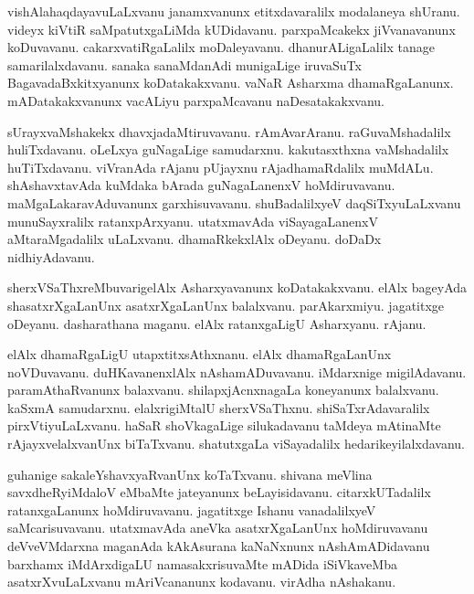 \documentclass{article}
\begin{document}
\begin{mn}%
vishAlahaqdayavuLaLxvanu janamxvanunx etitxdavaralilx modalaneya shUranu. videyx kiVtiR 
saMpatutxgaLiMda kUDidavanu. parxpaMcakekx jiVvanavanunx koDuvavanu. cakarxvatiRgaLalilx 
moDaleyavanu. dhanurALigaLalilx tanage samarilalxdavanu. sanaka sanaMdanAdi munigaLige iruvaSuTx 
BagavadaBxkitxyanunx koDatakakxvanu. vaNaR Asharxma dhamaRgaLanunx. mADatakakxvanunx vacALiyu 
parxpaMcavanu naDesatakakxvanu.
\end{mn}

\begin{mn}%
sUrayxvaMshakekx dhavxjadaMtiruvavanu. rAmAvarAranu. raGuvaMshadalilx huliTxdavanu. oLeLxya 
guNagaLige samudarxnu. kakutasxthxna vaMshadalilx huTiTxdavanu. viVranAda rAjanu pUjayxnu 
rAjadhamaRdalilx muMdALu. shAshavxtavAda kuMdaka bArada guNagaLanenxV hoMdiruvavanu. 
maMgaLakaravAduvanunx garxhisuvavanu. shuBadalilxyeV daqSiTxyuLaLxvanu munuSayxralilx 
ratanxpArxyanu. utatxmavAda viSayagaLanenxV aMtaraMgadalilx uLaLxvanu. dhamaRkekxlAlx oDeyanu. 
doDaDx nidhiyAdavanu.
\end{mn}

\begin{mn}%
sherxVSaThxreMbuvarigelAlx Asharxyavanunx koDatakakxvanu. elAlx bageyAda shasatxrXgaLanUnx 
asatxrXgaLanUnx balalxvanu. parAkarxmiyu. jagatitxge oDeyanu. dasharathana maganu. elAlx 
ratanxgaLigU Asharxyanu. rAjanu.
\end{mn}

\begin{mn}%
elAlx dhamaRgaLigU utapxtitxsAthxnanu. elAlx dhamaRgaLanUnx noVDuvavanu. duHKavanenxlAlx 
nAshamADuvavanu. iMdarxnige migilAdavanu. paramAthaRvanunx balaxvanu. shilapxjAcnxnagaLa 
koneyanunx balalxvanu. kaSxmA samudarxnu. elalxrigiMtalU sherxVSaThxnu. shiSaTxrAdavaralilx 
pirxVtiyuLaLxvanu. haSaR shoVkagaLige silukadavanu taMdeya mAtinaMte rAjayxvelalxvanUnx biTaTxvanu. 
shatutxgaLa viSayadalilx hedarikeyilalxdavanu.
\end{mn}

\begin{mn}%
guhanige sakaleYshavxyaRvanUnx koTaTxvanu. shivana meVlina savxdheRyiMdaloV eMbaMte jateyanunx 
beLayisidavanu. citarxkUTadalilx ratanxgaLanunx hoMdiruvavanu. jagatitxge Ishanu vanadalilxyeV 
saMcarisuvavanu. utatxmavAda aneVka asatxrXgaLanUnx hoMdiruvavanu deVveVMdarxna maganAda 
kAkAsurana kaNaNxnunx nAshAmADidavanu barxhamx iMdArxdigaLU namasakxrisuvaMte mADida iSiVkaveMba 
asatxrXvuLaLxvanu mAriVcananunx kodavanu. virAdha nAshakanu.
\end{mn}
\end{document}
